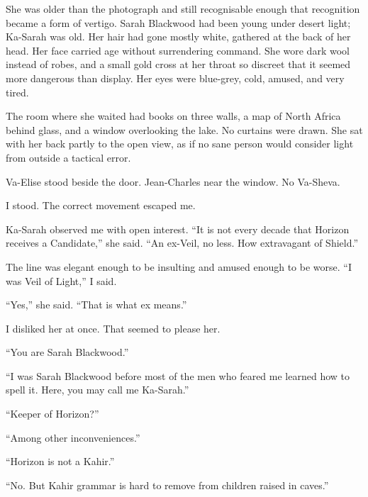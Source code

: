 She was older than the photograph and still recognisable enough that recognition became a form of vertigo. Sarah Blackwood had been young under desert light; Ka-Sarah was old. Her hair had gone mostly white, gathered at the back of her head. Her face carried age without surrendering command. She wore dark wool instead of robes, and a small gold cross at her throat so discreet that it seemed more dangerous than display. Her eyes were blue-grey, cold, amused, and very tired.\par

The room where she waited had books on three walls, a map of North Africa behind glass, and a window overlooking the lake. No curtains were drawn. She sat with her back partly to the open view, as if no sane person would consider light from outside a tactical error.\par

Va-Elise stood beside the door. Jean-Charles near the window. No Va-Sheva.\par

I stood. The correct movement escaped me.\par

Ka-Sarah observed me with open interest. ``It is not every decade that Horizon receives a Candidate,'' she said. ``An ex-Veil, no less. How extravagant of Shield.''\par

The line was elegant enough to be insulting and amused enough to be worse. ``I was Veil of Light,'' I said.\par

``Yes,'' she said. ``That is what ex means.''\par

I disliked her at once. That seemed to please her.\par

``You are Sarah Blackwood.''\par

``I was Sarah Blackwood before most of the men who feared me learned how to spell it. Here, you may call me Ka-Sarah.''\par

``Keeper of Horizon?''\par

``Among other inconveniences.''\par

``Horizon is not a Kahir.''\par

``No. But Kahir grammar is hard to remove from children raised in caves.''\par

